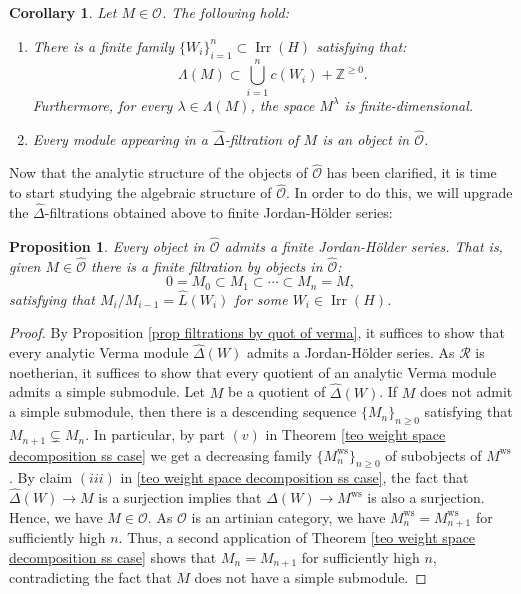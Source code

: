 \documentclass{amsart}
\newtheorem{prop}[defi]{ Proposition}
\newtheorem{coro}[defi]{Corollary}
\newcommand{\OX}{\mathcal{O}}
\begin{document}
\begin{coro}\label{coro analytic properties of OX}
Let $M\in \widehat{\OX}$. The following hold:
\begin{enumerate}[label=(\roman*)]
    \item There is a finite family $\{ W_i\}_{i=1}^n\subset \operatorname{Irr}(H)$ satisfying that:
    \begin{equation*}
        \Lambda(M)\subset \bigcup_{i=1}^nc(W_i)+\mathbb{Z}^{\geq 0}.
    \end{equation*}
    Furthermore, for every $\lambda \in \Lambda(M)$, the space $M^{\lambda}$ is finite-dimensional.
    \item Every module appearing in a $\widehat{\Delta}$-filtration of $M$ is an object in $\widehat{\OX}$.
\end{enumerate}
\end{coro}
Now that the analytic structure of the objects of  $\widehat{\OX}$ has been clarified, it is time to start studying the algebraic structure of $\widehat{\OX}$. In order to do this, we will upgrade the   $\widehat{\Delta}$-filtrations obtained above to finite Jordan-Hölder series:
\begin{prop}\label{prop JH series in analytic category O}
Every object in $\widehat{\OX}$ admits a finite Jordan-Hölder series. That is, given $M\in \widehat{\OX}$ there is a finite filtration by objects in $\widehat{\OX}$:
\begin{equation*}
    0=M_0\subset M_1\subset \cdots\subset M_n=M,
\end{equation*}
satisfying that $M_{i}/M_{i-1}=\widehat{L}(W_i)$ for some $W_i\in \operatorname{Irr}(H)$. 
\end{prop}
\begin{proof}
By Proposition  \ref{prop filtrations by quot of verma}, it suffices to show that every analytic Verma module $\widehat{\Delta}(W)$  admits a Jordan-Hölder series. As $\mathscr{R}$ is noetherian, it suffices to show that every quotient of an analytic Verma module admits a simple submodule. Let $M$ be a quotient of $\widehat{\Delta}(W)$. If $M$ does not admit a simple submodule, then there is a descending sequence $\{M_n\}_{n\geq 0}$
satisfying that $M_{n+1}\subsetneq M_n$. In particular, by part $(v)$ in Theorem \ref{teo weight space decomposition ss case} we get a decreasing family $\{M_n^{\operatorname{ws}}\}_{n\geq 0}$ of subobjects of $M^{\operatorname{ws}}$. By claim $(iii)$ in  \ref{teo weight space decomposition ss case}, the fact that $\widehat{\Delta}(W)\rightarrow M$ is a surjection implies that $\Delta(W)\rightarrow M^{\operatorname{ws}}$ is also a surjection. Hence, we have $M\in \OX$. As $\OX$ is an artinian category, we have $M_n^{\operatorname{ws}}=M_{n+1}^{\operatorname{ws}}$ for sufficiently high $n$.
Thus, a second application of Theorem \ref{teo weight space decomposition ss case} shows that  $M_n=M_{n+1}$ for sufficiently high $n$, contradicting the fact that $M$ does not have a simple submodule.
\end{proof}
\end{document}
